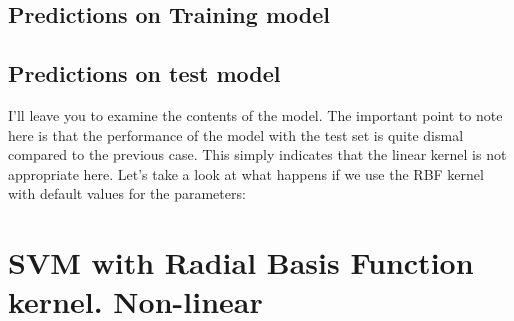 \documentclass[]{book}
\newenvironment{Shaded}{\begin{snugshade}}{\end{snugshade}}
\newcommand{\CommentTok}[1]{\textcolor[rgb]{0.56,0.35,0.01}{\textit{#1}}}
\newcommand{\DataTypeTok}[1]{\textcolor[rgb]{0.13,0.29,0.53}{#1}}
\newcommand{\KeywordTok}[1]{\textcolor[rgb]{0.13,0.29,0.53}{\textbf{#1}}}
\newcommand{\NormalTok}[1]{#1}
\newcommand{\OperatorTok}[1]{\textcolor[rgb]{0.81,0.36,0.00}{\textbf{#1}}}
\newcommand{\StringTok}[1]{\textcolor[rgb]{0.31,0.60,0.02}{#1}}
\begin{document}
\hypertarget{predictions-on-training-model-4}{%
\subsection{Predictions on Training model}\label{predictions-on-training-model-4}}

\begin{Shaded}
\end{Shaded}

\hypertarget{predictions-on-test-model-4}{%
\subsection{Predictions on test model}\label{predictions-on-test-model-4}}

\begin{Shaded}
\end{Shaded}

I'll leave you to examine the contents of the model. The important point to note here is that the performance of the model with the test set is quite dismal compared to the previous case. This simply indicates that the linear kernel is not appropriate here. Let's take a look at what happens if we use the RBF kernel with default values for the parameters:

\hypertarget{svm-with-radial-basis-function-kernel.-non-linear-1}{%
\section{SVM with Radial Basis Function kernel. Non-linear}\label{svm-with-radial-basis-function-kernel.-non-linear-1}}
\end{document}
